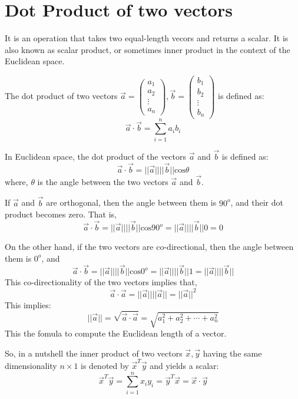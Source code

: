 \documentclass[conference,final,11pt,technote,onecolumn]{IEEEtran}\usepackage[]{graphicx}\usepackage[]{color}
\begin{document}
\section{Dot Product of two vectors}
\label{term:dot_product}
It is an operation that takes two equal-length vecors and returns a scalar. It is also known as scalar product, or sometimes inner product in the context of the Euclidean space.

The dot product of two vectors $\vec a=\begin{pmatrix}a_1\\a_2\\\vdots\\a_n\end{pmatrix}, \vec b=\begin{pmatrix}b_1\\b_2\\\vdots\\b_n\end{pmatrix}$ is defined as:
\[ \vec a \cdot \vec b = \sum_{i=1}^n a_ib_i\]

In Euclidean space, the dot product of the vectors $\vec a$ and $\vec b$ is defined as:
\[ \vec a \cdot \vec b = ||\vec a||||\vec b||\text{cos}\theta \]
where, $\theta$ is the angle between the two vectors $\vec a$ and $\vec b$.

If $\vec a$ and $\vec b$ are orthogonal, then the angle between them is $90^o$, and their dot product becomes zero. That is,
\[ \vec a \cdot \vec b = ||\vec a||||\vec b||\text{cos}90^o  = ||\vec a||||\vec b||0 = 0\]

On the other hand, if the two vectors are co-directional, then the angle between them is $0^o$, and
\[ \vec a \cdot \vec b = ||\vec a||||\vec b||\text{cos}0^o  = ||\vec a||||\vec b||1 = ||\vec a||||\vec b||\]
This co-directionality of the two vectors implies that, 
\[ \vec a \cdot \vec a = ||\vec a||||\vec a|| = ||\vec a||^2 \]
This implies:
\[ ||\vec a|| = \sqrt{\vec a \cdot \vec a} = \sqrt{a^2_1+a^2_2+\cdots+a^2_n} \]
This the fomula to compute the Euclidean length of a vector.

So, in a nutshell the inner product of two vectors $\vec x, \vec y$ having the same dimensionality $n\times 1$ is denoted by $\vec x^T\vec y$ and yields a scalar:
\[ \vec x^T\vec y = \sum_{i=1}^nx_iy_i = \vec y^T\vec x = \vec x \cdot \vec y\]
\end{document}
